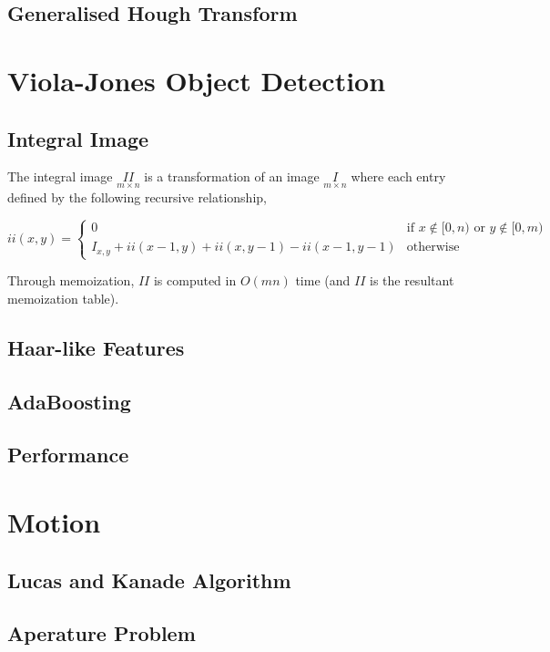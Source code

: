 \documentclass[10pt, a4paper]{article}
\begin{document}
  \subsection{Generalised Hough Transform}

  \section{Viola-Jones Object Detection}

  \subsection{Integral Image}

  The integral image $\underset{m \times n}{II}$ is a transformation of an image $\underset{m \times n}{I}$ where each entry defined by the following recursive relationship,

  $$
    ii(x, y) = \begin{cases}
      0 & \text{if } x \notin [0, n) \text{ or } y \notin [0, m) \\
      I_{x, y} + ii(x - 1, y) + ii(x, y - 1) - ii(x-1, y-1) & \text{otherwise}
    \end{cases}
  $$

  Through memoization, $II$ is computed in $O(mn)$ time (and $II$ is the resultant memoization table).

  \subsection{Haar-like Features}

  \subsection{AdaBoosting}

  \subsection{Performance}

  \section{Motion}

  \subsection{Lucas and Kanade Algorithm}

  \subsection{Aperature Problem}
\end{document}
